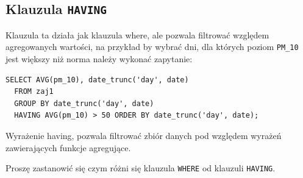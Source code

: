 \documentclass[a4paper]{article}
\begin{document}
\subsection{Klauzula \texttt{HAVING}%
  \label{klauzula-having}%
}

Klauzula ta działa jak klauzula where, ale pozwala filtrować
względem agregowanych wartości, na przykład by wybrać dni,
dla których poziom \texttt{PM\_10} jest większy niż norma
należy wykonać zapytanie:

\begin{verbatim}
SELECT AVG(pm_10), date_trunc('day', date)
  FROM zaj1
  GROUP BY date_trunc('day', date)
  HAVING AVG(pm_10) > 50 ORDER BY date_trunc('day', date);
\end{verbatim}


Wyrażenie having, pozwala filtrować zbiór danych pod względem wyrażeń
zawierających funkcje agregujące.

Proszę zastanowić się czym różni się klauzula \texttt{WHERE} od klauzuli \texttt{HAVING}.
\end{document}
